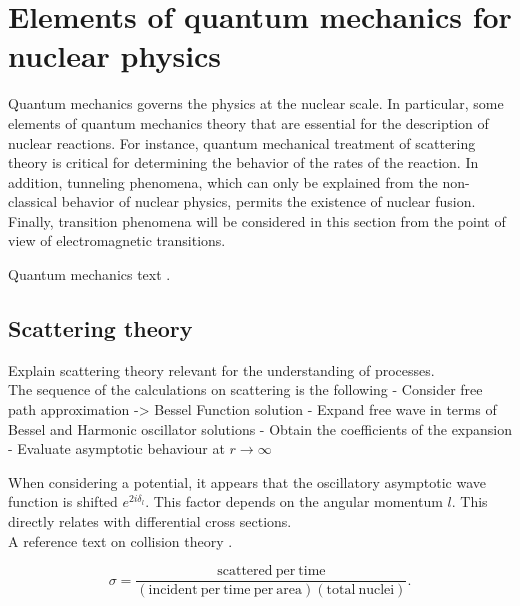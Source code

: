 \documentclass[openany]{book}
\begin{document}
\section{Elements of quantum mechanics for nuclear physics} \label{sec:quantumMechanics}

Quantum mechanics governs the physics at the nuclear scale. In particular, some elements of quantum mechanics theory that are essential for the description of nuclear reactions. For instance, quantum mechanical treatment of scattering theory is critical for determining the behavior of the rates of the reaction. In addition, tunneling phenomena, which can only be explained from the non-classical behavior of nuclear physics, permits the existence of nuclear fusion. Finally, transition phenomena will be considered in this section from the point of view of electromagnetic transitions. 

Quantum mechanics text \cite{dick_2016}.

\subsection{Scattering theory}


Explain scattering theory relevant for the understanding of  processes. \\

The sequence of the calculations on scattering is the following
-	Consider free path approximation -> Bessel Function solution  
-	Expand free wave in terms of Bessel and Harmonic oscillator solutions
-	Obtain the coefficients of the expansion 
-	Evaluate asymptotic behaviour at $r \rightarrow \infty$

When considering a potential, it appears that the oscillatory asymptotic wave function is shifted $e^{2i\delta_l}$. This factor depends on the angular momentum $l$. This directly relates with differential cross sections. \\

A reference text on collision theory \cite{joachain_1983}.

\begin{equation}
	\sigma  = \frac{\mathrm{scattered \ per \ time}}{(\mathrm{incident \ per \ time \ per \ area} )(\mathrm{total \ nuclei})}.
\end{equation}
\end{document}
